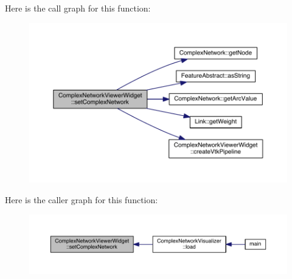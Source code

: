 Here is the call graph for this function\+:
\nopagebreak
\begin{figure}[H]
\begin{center}
\leavevmode
\includegraphics[width=350pt]{class_complex_network_viewer_widget_aed1e7ad3c16aaf0d744a6eee287e94b8_cgraph}
\end{center}
\end{figure}




Here is the caller graph for this function\+:\nopagebreak
\begin{figure}[H]
\begin{center}
\leavevmode
\includegraphics[width=350pt]{class_complex_network_viewer_widget_aed1e7ad3c16aaf0d744a6eee287e94b8_icgraph}
\end{center}
\end{figure}





